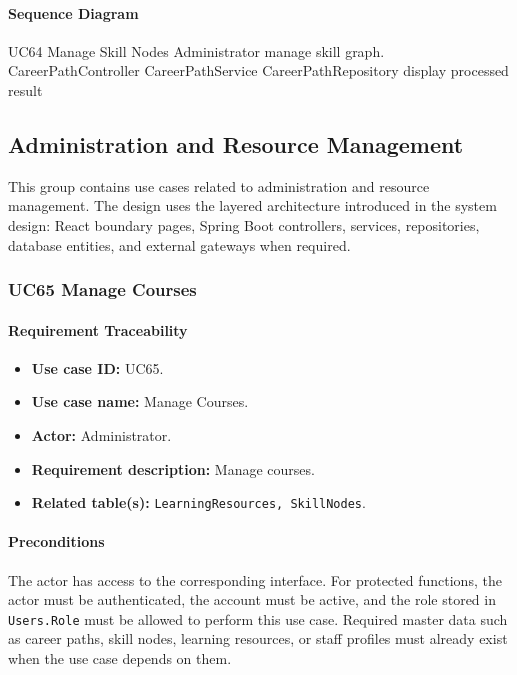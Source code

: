 \paragraph{Sequence Diagram}

\SequenceDiagram
{UC64 Manage Skill Nodes}
{Administrator}
{manage skill graph.}
{CareerPathController}
{CareerPathService}
{CareerPathRepository}
{display processed result}

\subsection{Administration and Resource Management}

This group contains use cases related to administration and resource management. The design uses the layered architecture introduced in the system design: React boundary pages, Spring Boot controllers, services, repositories, database entities, and external gateways when required.

\subsubsection{UC65 Manage Courses}

\paragraph{Requirement Traceability}

\begin{itemize}
    \item \textbf{Use case ID:} UC65.
    \item \textbf{Use case name:} Manage Courses.
    \item \textbf{Actor:} Administrator.
    \item \textbf{Requirement description:} Manage courses.
    \item \textbf{Related table(s):} \texttt{LearningResources, SkillNodes}.
\end{itemize}

\paragraph{Preconditions}

The actor has access to the corresponding interface. For protected functions, the actor must be authenticated, the account must be active, and the role stored in \texttt{Users.Role} must be allowed to perform this use case. Required master data such as career paths, skill nodes, learning resources, or staff profiles must already exist when the use case depends on them.

